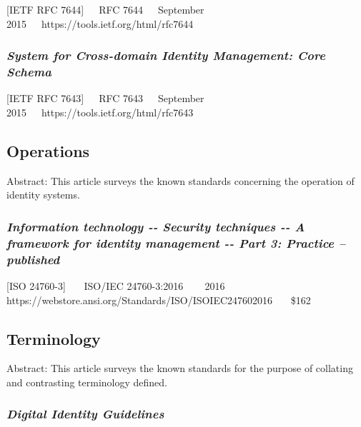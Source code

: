 {[}IETF RFC 7644{]}~~~RFC 7644~~~September
2015~~~https://tools.ietf.org/html/rfc7644

\hypertarget{system-for-cross-domain-identity-management-core-schema}{%
\subsubsection{\texorpdfstring{\emph{System for Cross-domain Identity
Management: Core
Schema}}{System for Cross-domain Identity Management: Core Schema}}\label{system-for-cross-domain-identity-management-core-schema}}

{[}IETF RFC 7643{]}~~~RFC 7643~~~September
2015~~~https://tools.ietf.org/html/rfc7643

\hypertarget{operations}{%
\subsection{Operations}\label{operations}}

Abstract: This article surveys the known standards concerning the
operation of identity systems.

\hypertarget{information-technology----security-techniques----a-framework-for-identity-management----part-3-practice-published}{%
\subsubsection{\texorpdfstring{\emph{Information technology -\/- Security
techniques -\/- A framework for identity management -\/- Part 3:
Practice --
published}}{Information technology -\/- Security techniques -\/- A framework for identity management -\/- Part 3: Practice -- published}}\label{information-technology----security-techniques----a-framework-for-identity-management----part-3-practice-published}}

{[}ISO 24760-3{]}~~~ ISO/IEC 24760-3:2016 ~~~ 2016~~~
https://webstore.ansi.org/Standards/ISO/ISOIEC247602016~~~ \$162

\hypertarget{terminology}{%
\subsection{Terminology}\label{terminology}}

Abstract: This article surveys the known standards for the purpose of
collating and contrasting terminology defined.

\hypertarget{digital-identity-guidelines-1}{%
\subsubsection{\texorpdfstring{\emph{Digital Identity
Guidelines}}{Digital Identity Guidelines}}\label{digital-identity-guidelines-1}}


